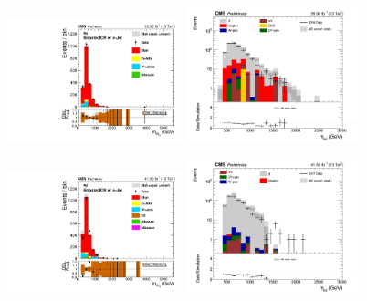 \begin{figure}[htbp]
  \centering

  \includegraphics[width=0.45\textwidth]{figures/2016/WRCand_Mass_HNWR_SingleMuon_EMu_Boosted_CR.pdf}
  \hspace{0.01\textwidth}
  \includegraphics[width=0.45\textwidth]{figures/2016/leadAK8JetElectronMass.png}
  \vspace{0.01\textwidth}

  \includegraphics[width=0.45\textwidth]{figures/2017/WRCand_Mass_HNWR_SingleMuon_EMu_Boosted_CR.pdf}
  \hspace{0.01\textwidth}
  \includegraphics[width=0.45\textwidth]{figures/2017/leadAK8JetElectronMass.png}
  

\end{figure}
